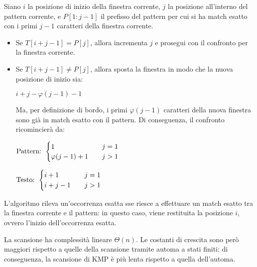 Siano $i$ la posizione di inizio della finestra corrente, $j$ la posizione all'interno del pattern corrente, e $P[1:j-1]$ il prefisso del pattern per cui si ha match esatto con i primi $j-1$ caratteri della finestra corrente.
\begin{itemize}
    \item Se $T[i + j - 1] = P[j]$, allora incrementa $j$ e prosegui con il    confronto per la finestra corrente.\\
    \item Se $T[i + j - 1] \neq P[j]$, allora sposta la finestra in modo che la nuova posizione di inizio sia:
    \begin{center}
        $i + j - \varphi(j-1) - 1$
    \end{center}
    Ma, per definizione di bordo, i primi $\varphi(j - 1)$ caratteri della nuova finestra sono già in match esatto con il pattern.
    Di conseguenza, il confronto ricomincierà da:
    \begin{center}
        $\textnormal{Pattern: } \begin{cases}
            1 & \quad j = 1 \\
            \varphi(j-1) + 1 & \quad j > 1
        \end{cases}$
    \end{center}
    \begin{center}
        $\textnormal{Testo: } \begin{cases}
            i + 1 & \quad j = 1 \\
            i + j - 1 & \quad j > 1
        \end{cases}$
    \end{center}
\end{itemize}
L'algoritmo rileva un'occorrenza esatta sse riesce a effettuare un match esatto tra la finestra corrente e il pattern: in questo caso, viene restituita la posizione $i$, ovvero l'inizio dell'occorrenza esatta.

La scansione ha complessità lineare $\Theta(n)$. Le costanti di crescita sono però maggiori rispetto a quelle della scansione tramite automa a stati finiti: di conseguenza, la scansione di KMP è più lenta rispetto a quella dell'automa.



